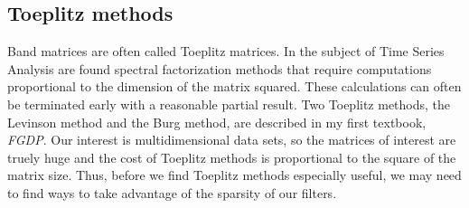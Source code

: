 
\subsection{Toeplitz methods}
Band matrices are often called Toeplitz matrices.
In the subject of Time Series Analysis are found
spectral factorization methods that require computations
proportional to the dimension of the matrix squared.
These calculations can often be terminated early with a reasonable partial result.
Two Toeplitz methods, the Levinson method
and the Burg method,
are described in my first textbook, {\em FGDP}.
Our interest is multidimensional data sets,
so
the matrices of interest are truely huge and the cost
of Toeplitz methods is proportional to the square of the matrix size.
Thus, before we find Toeplitz methods
especially useful, we may need to find
ways to take advantage of the sparsity of our filters.


\clearpage

